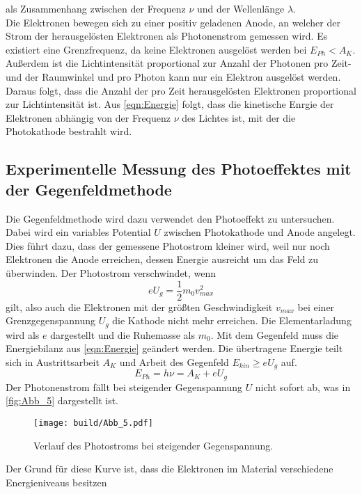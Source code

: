 als Zusammenhang zwischen der Frequenz $\nu$ und der Wellenlänge $\lambda$.\\
Die Elektronen bewegen sich zu einer positiv geladenen Anode, an welcher der Strom der herausgelösten
Elektronen als Photonenstrom gemessen wird. Es existiert eine Grenzfrequenz, da keine Elektronen 
ausgelöst werden bei $E_{Ph} < A_K$. Außerdem ist die Lichtintensität proportional zur Anzahl der 
Photonen pro Zeit- und der Raumwinkel und pro Photon kann nur ein Elektron ausgelöst werden.
Daraus folgt, dass die Anzahl der pro Zeit herausgelösten Elektronen proportional zur Lichtintensität ist.
Aus \autoref{eqn:Energie} folgt, dass die kinetische Enrgie der Elektronen abhängig von der Frequenz $\nu$ des
Lichtes ist, mit der die Photokathode bestrahlt wird.

\subsection{Experimentelle Messung des Photoeffektes mit der Gegenfeldmethode}
\label{sec:Gegenfeldmethode}
Die Gegenfeldmethode wird dazu verwendet den Photoeffekt zu untersuchen. Dabei wird ein variables Potential $U$
zwischen Photokathode und Anode angelegt. Dies führt dazu, dass der gemessene Photostrom kleiner wird, weil nur noch Elektronen 
die Anode erreichen, dessen Energie ausreicht um das Feld zu überwinden. Der Photostrom verschwindet, wenn
\begin{equation*}
    e U_g = \frac{1}{2} m_0 v^2_{max}
\end{equation*}
gilt, also auch die Elektronen mit der größten Geschwindigkeit $v_{max}$ bei einer Grenzgegenspannung $U_g$ die Kathode nicht mehr erreichen.
Die Elementarladung wird als $e$ dargestellt und die Ruhemasse als $m_0$. Mit dem Gegenfeld muss die Energiebilanz aus \autoref{eqn:Energie} geändert werden.
Die übertragene Energie teilt sich in Austrittsarbeit $A_K$ und Arbeit des Gegenfeld $E_{kin} \geq e U_g$ auf.
\begin{equation*}
    E_{Ph} = h \nu = A_K + e U_g
\end{equation*}
Der Photonenstrom fällt bei steigender Gegenspannung $U$ nicht sofort ab, was in \autoref{fig:Abb_5} dargestellt ist.
\begin{figure}[H]
    \centering
    \texttt{[image: build/Abb\_5.pdf]}
    \caption{Verlauf des Photostroms bei steigender Gegenspannung.\cite{V500}}
    \label{fig:Abb_5}
\end{figure}
Der Grund für diese Kurve ist, dass die Elektronen im Material verschiedene Energieniveaus besitzen 
